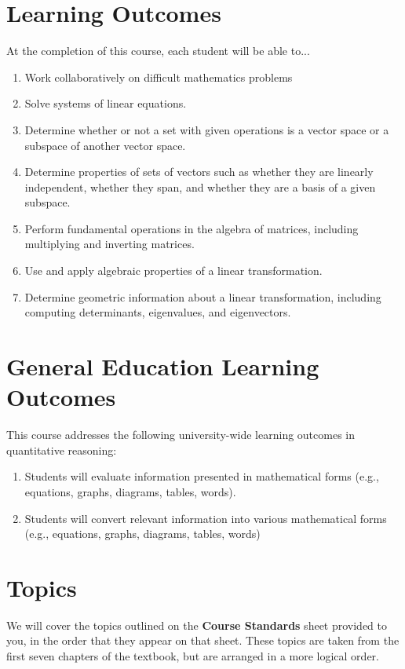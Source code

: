 \documentclass{article}
\begin{document}
\section*{\fontsize{12}{15}\selectfont Learning Outcomes}
At the completion of this course, each student will be able to...
\begin{enumerate}[1)]
\item Work collaboratively on difficult mathematics problems
\item Solve systems of linear equations.
\item Determine whether or not a set with given operations is a vector space or a subspace of another vector space.
\item Determine properties of sets of vectors such as whether they are linearly independent, whether they span, and whether they are a basis of a given subspace.
\item Perform fundamental operations in the algebra of matrices, including multiplying and inverting matrices.
\item Use and apply algebraic properties of a linear transformation.
\item Determine geometric information about a linear transformation, including computing determinants, eigenvalues, and eigenvectors.
\end{enumerate}

\section*{\fontsize{12}{15}\selectfont General Education Learning Outcomes}
This course addresses the following university-wide learning outcomes in quantitative reasoning:
\begin{enumerate}[1)]
\item Students will evaluate information presented in mathematical forms (e.g., equations, graphs, diagrams, tables, words).
\item Students will convert relevant information into various mathematical forms (e.g., equations, graphs, diagrams, tables, words)
\end{enumerate}


\section*{\fontsize{12}{15}\selectfont Topics}
We will cover the topics outlined on the \textbf{Course Standards}
sheet provided to you, in the order that they appear on that sheet.
These topics are taken from the first seven chapters of the textbook,
but are arranged in a more logical order.
\end{document}
